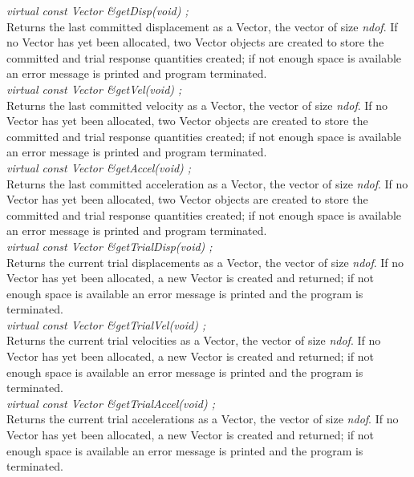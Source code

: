 {\em  virtual const Vector \&getDisp(void) ;}  \\
Returns the last committed displacement as a Vector, the vector of
size {\em ndof}. If no Vector has yet been allocated, two Vector
objects are created to store the committed and trial response
quantities created; if not enough space is available an error message
is printed and program terminated. \\ 

{\em  virtual const Vector \&getVel(void) ;}  \\
Returns the last committed velocity as a Vector, the vector of size
{\em ndof}. If no Vector has yet been allocated, two Vector
objects are created to store the committed and trial response
quantities created; if not enough space is available an error message
is printed and program terminated. \\ 


{\em  virtual const Vector \&getAccel(void) ;}  \\
Returns the last committed acceleration as a Vector, the vector of
size {\em ndof}. If no Vector has yet been allocated, two Vector 
objects are created to store the committed and trial response
quantities created; if not enough space is available an error message
is printed and program terminated. \\ 

{\em  virtual const Vector \&getTrialDisp(void) ;}  \\
Returns the current trial displacements as a Vector, the vector of size {\em ndof}.
If no Vector has yet been allocated, a new Vector is created and returned;
if not enough space is available an error message is printed and the
program is terminated. \\ 


{\em  virtual const Vector \&getTrialVel(void) ;}  \\
Returns the current trial velocities as a Vector, the vector of size {\em ndof}.
If no Vector has yet been allocated, a new Vector is created and returned;
if not enough space is available an error message is printed and the
program is terminated. \\ 

{\em  virtual const Vector \&getTrialAccel(void) ;}  \\
Returns the current trial accelerations as a Vector, the vector of size {\em ndof}.
If no Vector has yet been allocated, a new Vector is created and returned;
if not enough space is available an error message is printed and the
program is terminated. \\ 


